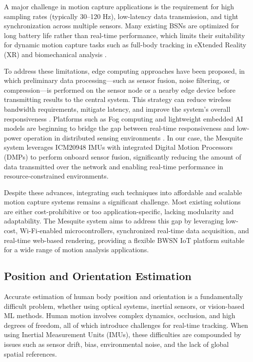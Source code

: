 \documentclass[lettersize,journal]{IEEEtran}
\begin{document}
A major challenge in motion capture applications is the requirement for high sampling rates (typically 30–120 Hz), low-latency data transmission, and tight synchronization across multiple sensors. Many existing BSNs are optimized for long battery life rather than real-time performance, which limits their suitability for dynamic motion capture tasks such as full-body tracking in eXtended Reality (XR) and biomechanical analysis \cite{park2010wireless}.

To address these limitations, edge computing approaches have been proposed, in which preliminary data processing—such as sensor fusion, noise filtering, or compression—is performed on the sensor node or a nearby edge device before transmitting results to the central system. This strategy can reduce wireless bandwidth requirements, mitigate latency, and improve the system’s overall responsiveness \cite{rahmani2018edge}. Platforms such as Fog computing and lightweight embedded AI models are beginning to bridge the gap between real-time responsiveness and low-power operation in distributed sensing environments \cite{pham2021iot}. In our case, the Mesquite system leverages ICM20948 IMUs with integrated Digital Motion Processors (DMPs) to perform onboard sensor fusion, significantly reducing the amount of data transmitted over the network and enabling real-time performance in resource-constrained environments.

Despite these advances, integrating such techniques into affordable and scalable motion capture systems remains a significant challenge. Most existing solutions are either cost-prohibitive or too application-specific, lacking modularity and adaptability. The Mesquite system aims to address this gap by leveraging low-cost, Wi-Fi-enabled microcontrollers, synchronized real-time data acquisition, and real-time web-based rendering, providing a flexible BWSN IoT platform suitable for a wide range of motion analysis applications.

\subsection{Position and Orientation Estimation}
Accurate estimation of human body position and orientation is a fundamentally difficult problem, whether using optical systems, inertial sensors, or vision-based ML methods. Human motion involves complex dynamics, occlusion, and high degrees of freedom, all of which introduce challenges for real-time tracking. When using Inertial Measurement Units (IMUs), these difficulties are compounded by issues such as sensor drift, bias, environmental noise, and the lack of global spatial references.
\end{document}

